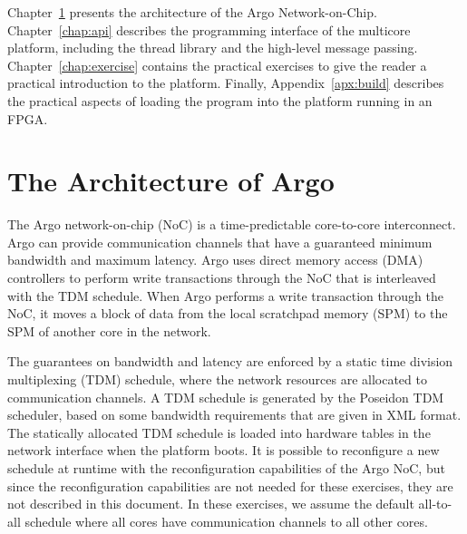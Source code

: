 \documentclass[a4paper,fontsize=10pt,twoside,DIV15,BCOR12mm,headinclude=true,footinclude=false,pagesize,bibtotoc]{scrbook}
\begin{document}
Chapter~\ref{chap:arch} presents the architecture of the Argo Network-on-Chip.
Chapter~\ref{chap:api} describes the programming interface of the multicore platform, including the thread library and the high-level message passing.
Chapter~\ref{chap:exercise} contains the practical exercises to give the reader a practical introduction to the platform.
Finally, Appendix~\ref{apx:build} describes the practical aspects of loading the program into the platform running in an FPGA.


\chapter{The Architecture of Argo}
\label{chap:arch}
The Argo network-on-chip (NoC) is a time-predictable core-to-core interconnect. Argo can provide communication channels that have a guaranteed minimum bandwidth and maximum latency.
Argo uses direct memory access (DMA) controllers to perform write transactions through the NoC that is interleaved with the TDM schedule.
When Argo performs a write transaction through the NoC, it moves a block of data from the local scratchpad memory (SPM) to the SPM of another core in the network.


The guarantees on bandwidth and latency are enforced by a static time division multiplexing (TDM) schedule, where the network resources are allocated to communication channels.
A TDM schedule is generated by the Poseidon TDM scheduler, based on some bandwidth requirements that are given in XML format.
The statically allocated TDM schedule is loaded
into hardware tables in the network interface when the platform boots.
It is possible to reconfigure a new schedule at runtime with the reconfiguration capabilities of the Argo NoC, but since the reconfiguration capabilities are not needed for these exercises, they are not described in this document.
In these exercises, we assume the default all-to-all schedule where all cores have communication channels to all other cores.
\end{document}
